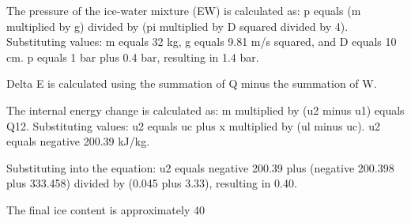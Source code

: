 The pressure of the ice-water mixture (EW) is calculated as:  
p equals (m multiplied by g) divided by (pi multiplied by D squared divided by 4).  
Substituting values:  
m equals 32 kg, g equals 9.81 m/s squared, and D equals 10 cm.  
p equals 1 bar plus 0.4 bar, resulting in 1.4 bar.  

Delta E is calculated using the summation of Q minus the summation of W.  

The internal energy change is calculated as:  
m multiplied by (u2 minus u1) equals Q12.  
Substituting values:  
u2 equals uc plus x multiplied by (ul minus uc).  
u2 equals negative 200.39 kJ/kg.  

Substituting into the equation:  
u2 equals negative 200.39 plus (negative 200.398 plus 333.458) divided by (0.045 plus 3.33), resulting in 0.40.  

The final ice content is approximately 40%